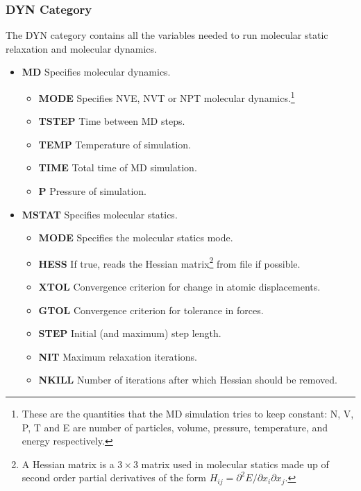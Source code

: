 \documentclass{article}
\begin{document}
\begin{multicols}{2}
\subsubsection{DYN Category}
\label{sec:DYN}
The DYN category contains all the variables needed to run molecular static relaxation and molecular dynamics.
\begin{itemize}
	\item \textbf{MD} Specifies molecular dynamics.
	\begin{itemize}
		\item\textbf{MODE} Specifies NVE, NVT or NPT molecular dynamics.\footnote{These are the quantities that the MD simulation tries to keep constant: N, V, P, T and E are number of particles, volume, pressure, temperature, and energy respectively.}
		\item\textbf{TSTEP} Time between MD steps. 
		\item\textbf{TEMP} Temperature of simulation.
		\item\textbf{TIME} Total time of MD simulation.
		\item\textbf{P} Pressure of simulation.
	\end{itemize}
	\item \textbf{MSTAT} Specifies molecular statics.
	\begin{itemize}
		\item\textbf{MODE} Specifies the molecular statics mode.
		\item\textbf{HESS} If true, reads the Hessian matrix\footnote{A Hessian matrix is a $3 \times 3$ matrix used in molecular statics made up of second order partial derivatives of the form $H_{ij}= \partial^{2}E/\partial x_{i}\partial x_{j}$.} from file if possible. 
		\item\textbf{XTOL} Convergence criterion for change in atomic displacements.
		\item\textbf{GTOL} Convergence criterion for tolerance in forces.
		\item\textbf{STEP} Initial (and maximum) step length.
		\item\textbf{NIT} Maximum relaxation iterations.
		\item\textbf{NKILL} Number of iterations after which Hessian should be removed.
	\end{itemize}
\end{itemize}

\end{multicols}
\end{document}
